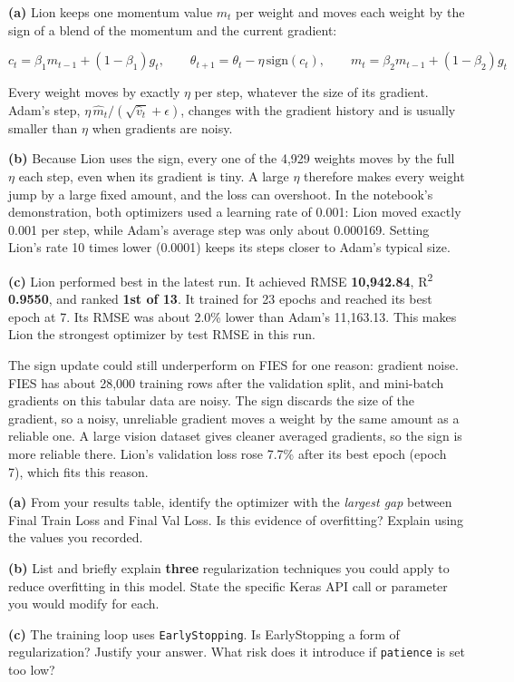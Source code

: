 \documentclass[12pt,a4paper]{article}
\begin{document}
\begin{answerbox}
\textbf{(a)} Lion keeps one momentum value \(m_t\) per weight and moves each weight by the sign of a blend of the momentum and the current gradient:

\[c_t=\beta_1 m_{t-1}+(1-\beta_1)g_t,\qquad \theta_{t+1}=\theta_t-\eta\,\mathrm{sign}(c_t),\qquad m_t=\beta_2 m_{t-1}+(1-\beta_2)g_t\]

Every weight moves by exactly \(\eta\) per step, whatever the size of its gradient. Adam's step, \(\eta\,\hat m_t/(\sqrt{\hat v_t}+\epsilon)\), changes with the gradient history and is usually smaller than \(\eta\) when gradients are noisy.

\textbf{(b)} Because Lion uses the sign, every one of the 4,929 weights moves by the full \(\eta\) each step, even when its gradient is tiny. A large \(\eta\) therefore makes every weight jump by a large fixed amount, and the loss can overshoot. In the notebook's demonstration, both optimizers used a learning rate of 0.001: Lion moved exactly 0.001 per step, while Adam's average step was only about 0.000169. Setting Lion's rate 10 times lower (0.0001) keeps its steps closer to Adam's typical size.

\textbf{(c)} Lion performed best in the latest run. It achieved RMSE \textbf{10,942.84}, R\textsuperscript{2} \textbf{0.9550}, and ranked \textbf{1st of 13}. It trained for 23 epochs and reached its best epoch at 7. Its RMSE was about 2.0\% lower than Adam's 11,163.13. This makes Lion the strongest optimizer by test RMSE in this run.

The sign update could still underperform on FIES for one reason: gradient noise. FIES has about 28,000 training rows after the validation split, and mini-batch gradients on this tabular data are noisy. The sign discards the size of the gradient, so a noisy, unreliable gradient moves a weight by the same amount as a reliable one. A large vision dataset gives cleaner averaged gradients, so the sign is more reliable there. Lion's validation loss rose 7.7\% after its best epoch (epoch 7), which fits this reason.
\end{answerbox}

\begin{tcolorbox}[colback=lightblue!40, colframe=myColorB,
  title={\textbf{Question 8 — Overfitting and Regularization} \hfill \normalfont(10 pts)},
  fonttitle=\normalsize\bfseries, breakable]

\textbf{(a)} From your results table, identify the optimizer with the
\emph{largest gap} between Final Train Loss and Final Val Loss.
Is this evidence of overfitting? Explain using the values you recorded.

\textbf{(b)} List and briefly explain \textbf{three} regularization techniques you
could apply to reduce overfitting in this model. State the specific Keras API
call or parameter you would modify for each.

\textbf{(c)} The training loop uses \texttt{EarlyStopping}.
Is EarlyStopping a form of regularization? Justify your answer.
What risk does it introduce if \texttt{patience} is set too low?
\end{tcolorbox}
\end{document}
